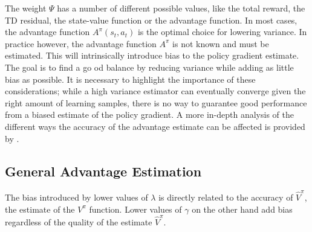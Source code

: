 The weight $\Psi$ has a number of different possible values, like the total reward, the TD residual, the state-value function or the advantage function. In most cases, the advantage function $A^\pi(s_t, a_t)$ is the optimal choice for lowering variance. 
In practice however, the advantage function $A^\pi$ is not known and must be estimated. This will intrinsically introduce bias to the policy gradient estimate. The goal is to find a go	od balance by reducing variance while adding as little bias as possible. It is necessary to highlight the importance of these considerations; while a high variance estimator can eventually converge given the right amount of learning samples, there is no way to guarantee good performance from a biased estimate of the policy gradient. 
A more in-depth analysis of the different ways the accuracy of the advantage estimate can be affected is provided by \cite{schulman2015highdimensional}. 

\subsection{General Advantage Estimation}



The bias introduced by lower values of $\lambda$ is directly related to the accuracy of $\hat{V}^\pi$, the estimate of the $V^\pi$ function. Lower values of $\gamma$ on the other hand add bias regardless of the quality of the estimate $\hat{V}^\pi$.

